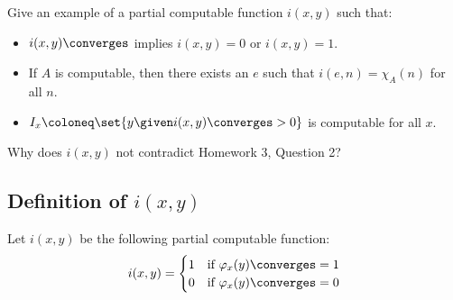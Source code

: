 \begin{problem}
  Give an example of a partial computable function $i(x, y)$ such that:
  \begin{itemize}
    \item $i(x, y) \converges$ implies $i(x, y) = 0$ or $i(x, y) = 1$.
    \item If $A$ is computable, then there exists an $e$ such that
      $i(e, n) = \chi_A(n)$ for all $n$.
    \item $I_x \coloneq \set{ y \given i(x, y) \converges > 0 }$ is computable
      for all $x$.
  \end{itemize}
  Why does $i(x, y)$ not contradict Homework 3, Question 2?

  \begin{answer}
    \subsection*{Definition of $i(x, y)$}
    Let $i(x, y)$ be the following partial computable function:
    \[
      i(x, y) = \begin{cases}
        1 & \text{if } \varphi_x(y) \converges= 1 \\
        0 & \text{if } \varphi_x(y) \converges= 0 \\
      \end{cases}
    \]
  \end{answer}
\end{problem}
